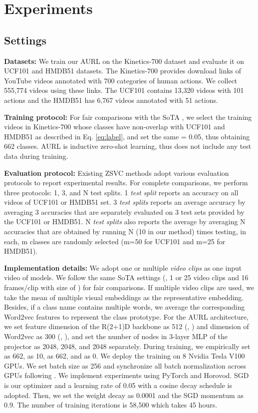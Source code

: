 \documentclass[10pt,twocolumn,letterpaper]{article}
\begin{document}
\section{Experiments}

\subsection{Settings}
{\bf Datasets:}
We train our AURL on the Kinetics-700 dataset \cite{kay2017kinetics} and evaluate it on UCF101 \cite{soomro2012dataset} and HMDB51 \cite{kuehne2011hmdb} datasets.
The Kinetics-700 provides download links of YouTube videos annotated with 700 categories of human actions.
We collect 555,774 videos using these links.
The UCF101 contains 13,320 videos with 101 actions and the HMDB51 has 6,767 videos annotated with 51 actions.


{\bf Training protocol:}
For fair comparisons with the SoTA \cite{brattoli2020rethinking}, we select the training videos in Kinetics-700 whose classes have non-overlap with UCF101 and HMDB51 as described in Eq. \ref{eq:label}, and set the same  = 0.05, thus obtaining 662 classes.
AURL is inductive zero-shot learning, thus does not include any test data during training.


{\bf Evaluation protocol:}
Existing ZSVC methods adopt various evaluation protocols to report experimental results.
For complete comparisons, we perform three protocols: 1, 3, and N test splits.
1 {\em test split} reports an accuracy on all videos of UCF101 or HMDB51 set.
3 {\em test splits} reports an average accuracy by averaging 3 accuracies that are separately evaluated on 3 test sets provided by the UCF101 or HMDB51.
N {\em test splits} also reports the average by averaging N accuracies that are obtained by running N (10 in our method) times testing, in each, m classes are randomly selected (m=50 for UCF101 and m=25 for HMDB51). 

{\bf Implementation details:}
We adopt one or multiple {\em video clips} as one input video of models.
We follow the same SoTA settings \cite{brattoli2020rethinking} (\ie, 1 or 25 video clips and 16 frames/clip with size of ) for fair comparisons.
If multiple video clips are used, we take the mean of multiple visual embeddings as the representative embedding.
Besides, if a class name contains multiple words, we average the corresponding Word2vec features to represent the class prototype.
For the AURL architecture, we set feature dimension of the R(2+1)D backbone as 512 (\ie, ) and dimension of Word2vec as 300 (\ie, ), and set the number of nodes in 3-layer MLP of the projector as 2048, 2048, and 2048 separately.
During training, we empirically set  as 662,  as 10,  as 662, and  as 0.
We deploy the training on 8 Nvidia Tesla V100 GPUs.
We set batch size as 256 and synchronize all batch normalization across GPUs following \cite{chen2020simple,caron2020unsupervised}.
We implement experiments using PyTorch and Horovod.
SGD is our optimizer and a learning rate of 0.05 with a cosine decay schedule \cite{chen2020simple,loshchilov2016sgdr} is adopted.
Then, we set the weight decay as 0.0001 and the SGD momentum as 0.9.
The number of training iterations is 58,500 which takes 45 hours.
\end{document}
